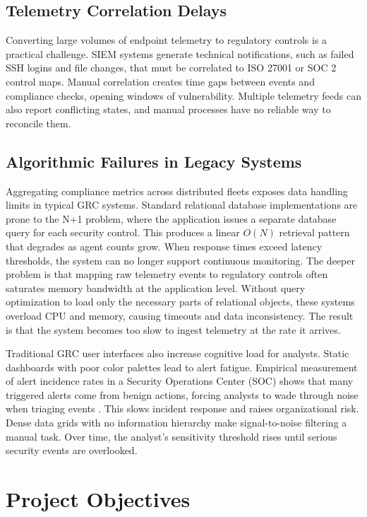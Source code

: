 \subsection{Telemetry Correlation Delays}
Converting large volumes of endpoint telemetry to regulatory controls is a practical challenge. SIEM systems generate technical notifications, such as failed SSH logins and file changes, that must be correlated to ISO 27001 or SOC 2 control maps. Manual correlation creates time gaps between events and compliance checks, opening windows of vulnerability. Multiple telemetry feeds can also report conflicting states, and manual processes have no reliable way to reconcile them.

\subsection{Algorithmic Failures in Legacy Systems}
Aggregating compliance metrics across distributed fleets exposes data handling limits in typical GRC systems. Standard relational database implementations are prone to the N+1 problem, where the application issues a separate database query for each security control. This produces a linear $O(N)$ retrieval pattern that degrades as agent counts grow. When response times exceed latency thresholds, the system can no longer support continuous monitoring. The deeper problem is that mapping raw telemetry events to regulatory controls often saturates memory bandwidth at the application level. Without query optimization to load only the necessary parts of relational objects, these systems overload CPU and memory, causing timeouts and data inconsistency. The result is that the system becomes too slow to ingest telemetry at the rate it arrives.

Traditional GRC user interfaces also increase cognitive load for analysts. Static dashboards with poor color palettes lead to alert fatigue. Empirical measurement of alert incidence rates in a Security Operations Center (SOC) shows that many triggered alerts come from benign actions, forcing analysts to wade through noise when triaging events \cite{yang2024true}. This slows incident response and raises organizational risk. Dense data grids with no information hierarchy make signal-to-noise filtering a manual task. Over time, the analyst's sensitivity threshold rises until serious security events are overlooked.
\section{Project Objectives}

